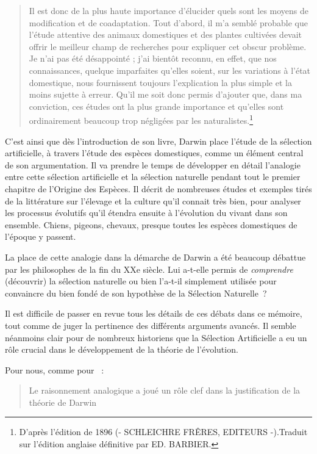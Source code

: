 \begin{quotation}
	Il est donc de la plus haute importance d'élucider quels sont les moyens de modification et de coadaptation. Tout d'abord, il m'a semblé probable que l'étude attentive des animaux domestiques et des plantes cultivées devait offrir le meilleur champ de recherches pour expliquer cet obscur problème. Je n'ai pas été désappointé ; j'ai bientôt reconnu, en effet, que nos connaissances, quelque imparfaites qu'elles soient, sur les variations à l'état domestique, nous fournissent toujours l'explication la plus simple et la moins sujette à erreur. Qu'il me soit donc permis d'ajouter que, dans ma conviction, ces études ont la plus grande importance et qu'elles sont ordinairement beaucoup trop négligées par les naturalistes.\footnote{\citet[Introduction]{darwin1859originspeciesbymeansnaturalselectionorpreservationfavouredracesstrugglelife}	D'après l'édition de 1896 (- SCHLEICHRE FRÊRES, EDITEURS -).Traduit sur l'édition anglaise définitive par ED. BARBIER.
}
\end{quotation}

C'est ainsi que dès l'introduction de son livre, Darwin place l'étude de la sélection artificielle, à travers l'étude des espèces domestiques, comme un élément central de son argumentation. Il va prendre le temps de développer en détail l'analogie entre cette sélection artificielle et la sélection naturelle pendant tout le premier chapitre de l'Origine des Espèces.  Il décrit de nombreuses études et exemples tirés de la littérature sur l'élevage et la culture qu'il connait très bien, pour analyser les processus évolutifs qu'il étendra ensuite à l'évolution du vivant dans son ensemble. Chiens, pigeons, chevaux, presque toutes les espèces domestiques de l'époque y passent.

La place de cette analogie dans la démarche de Darwin a été beaucoup débattue par les philosophes de la fin du XXe siècle. Lui a-t-elle permis de \emph{comprendre} (découvrir) la sélection naturelle ou bien l'a-t-il simplement utilisée pour convaincre du bien fondé de son hypothèse de la Sélection Naturelle~? 

Il est difficile de passer en revue tous les détails de ces débats dans ce mémoire, tout comme de juger la pertinence des différents arguments avancés. Il semble néanmoins clair pour de nombreux historiens que la Sélection Artificielle a eu un rôle crucial dans le développement de la théorie de l'évolution. 

Pour nous, comme pour \cite{waters86takinganalogicalinferenceseriouslydarwinsargumentartificialselection}~:
\begin{quote}
	Le raisonnement analogique a joué un rôle clef dans la justification de la théorie de Darwin \citep[p. 410]{waters86takinganalogicalinferenceseriouslydarwinsargumentartificialselection}
\end{quote}

